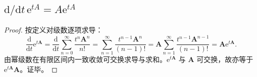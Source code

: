 \subsection*{$\mathrm{d}/\mathrm{d}t\,\mathrm{e}^{tA} = A\mathrm{e}^{tA}$}

\begin{proof}
按定义对级数逐项求导：
\[
\frac{\mathrm{d}}{\mathrm{d}t}\mathrm{e}^{t\boldsymbol{A}} = \frac{\mathrm{d}}{\mathrm{d}t}\sum_{n=0}^{\infty}\frac{t^{n}\boldsymbol{A}^{n}}{n!} = \sum_{n=1}^{\infty}\frac{t^{n-1}\boldsymbol{A}^{n}}{(n-1)!} = \boldsymbol{A}\sum_{n=1}^{\infty}\frac{t^{n-1}\boldsymbol{A}^{n-1}}{(n-1)!} = \boldsymbol{A}\mathrm{e}^{t\boldsymbol{A}}.
\]
由幂级数在有限区间内一致收敛可交换求导与求和。$\mathrm{e}^{t\boldsymbol{A}}$ 与 $\boldsymbol{A}$ 可交换，故亦等于 $\mathrm{e}^{t\boldsymbol{A}}\boldsymbol{A}$。证毕。
\end{proof}
